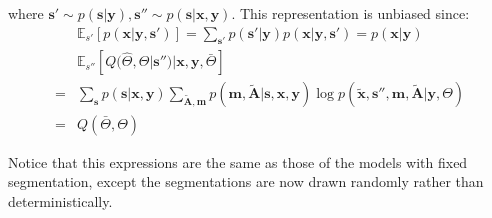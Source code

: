 \documentclass[journal]{IEEEtran}
\begin{document}
where $\mathbf s' \sim p(\mathbf s|\mathbf y), \mathbf s'' \sim p(\mathbf s|\mathbf x, \mathbf y)$. This representation is unbiased since:
\begin{align*}%
    &\mathbb E_{s'}[p(\mathbf x|\mathbf y, \mathbf s')] = \sum_{\mathbf s'} p(\mathbf s'|\mathbf y) p(\mathbf x|\mathbf y, \mathbf s') = p(\mathbf x|\mathbf y)\\
    &\mathbb E_{s''}[Q(\hat{\Theta}, \Theta|\mathbf s'')|\mathbf x, \mathbf y, \bar{\Theta}] \\
    =& \sum_{\mathbf s} p(\mathbf s|\mathbf x, \mathbf y)\sum_{\tilde{\mathbf A}, \mathbf m} p(\mathbf m, \tilde{\mathbf A}|\mathbf s, \mathbf x, \mathbf y) \log p(\tilde{\mathbf x}, \mathbf s'', \mathbf m, \tilde{\mathbf A}|\mathbf y, \Theta)\\
    =& Q(\bar{\Theta}, \Theta)
\end{align*}

Notice that this expressions are the same as those of the models with fixed segmentation, except the segmentations are now drawn randomly rather than deterministically.
\end{document}
